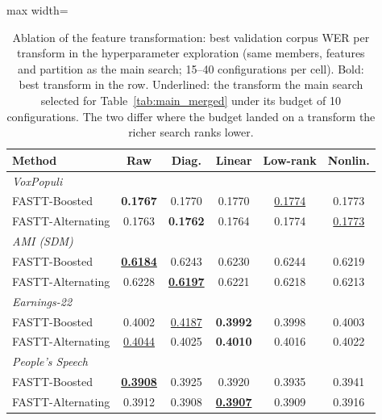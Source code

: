 \begin{table}[t]
    \centering
    \caption{Ablation of the feature transformation: best validation corpus WER per transform in the hyperparameter exploration (same members, features and partition as the main search; 15--40 configurations per cell). Bold: best transform in the row. Underlined: the transform the main search selected for Table~\ref{tab:main_merged} under its budget of 10 configurations. The two differ where the budget landed on a transform the richer search ranks lower.}
    \label{tab:ablation_transform} \footnotesize \setlength{\tabcolsep}{3pt}
    \begin{adjustbox}{max width=\linewidth}
    \begin{tabular}{lccccc}
        \toprule
        \textbf{Method} & \textbf{Raw} & \textbf{Diag.} & \textbf{Linear} & \textbf{Low-rank} & \textbf{Nonlin.} \\
        \midrule
        \multicolumn{6}{l}{\textit{VoxPopuli}} \\
        FASTT-Boosted & \textbf{0.1767} & 0.1770 & 0.1770 & \underline{0.1774} & 0.1773 \\
        FASTT-Alternating & 0.1763 & \textbf{0.1762} & 0.1764 & 0.1774 & \underline{0.1773} \\
        \midrule \multicolumn{6}{l}{\textit{AMI (SDM)}} \\
        FASTT-Boosted & \underline{\textbf{0.6184}} & 0.6243 & 0.6230 & 0.6244 & 0.6219 \\
        FASTT-Alternating & 0.6228 & \underline{\textbf{0.6197}} & 0.6221 & 0.6218 & 0.6213 \\
        \midrule \multicolumn{6}{l}{\textit{Earnings-22}} \\
        FASTT-Boosted & 0.4002 & \underline{0.4187} & \textbf{0.3992} & 0.3998 & 0.4003 \\
        FASTT-Alternating & \underline{0.4044} & 0.4025 & \textbf{0.4010} & 0.4016 & 0.4022 \\
        \midrule \multicolumn{6}{l}{\textit{People's Speech}} \\
        FASTT-Boosted & \underline{\textbf{0.3908}} & 0.3925 & 0.3920 & 0.3935 & 0.3941 \\
        FASTT-Alternating & 0.3912 & 0.3908 & \underline{\textbf{0.3907}} & 0.3909 & 0.3916 \\
        \bottomrule
    \end{tabular}
    \end{adjustbox}
\end{table}
